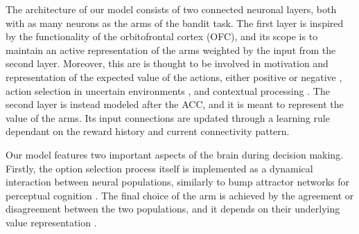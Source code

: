 The architecture of our model consists of two connected neuronal layers, both with as many neurons as the arms of the bandit task.
The first layer is inspired by the functionality of the orbitofrontal cortex (OFC), and its scope is to maintain an active representation of the arms weighted by the input from the second layer. Moreover, this are is thought to be involved in motivation and representation of the expected value of the actions, either positive or negative \cite{odohertyAbstractRewardPunishment2001, ricebergRewardStabilityDetermines2012, tremblayRelativeRewardPreference1999}, action selection in uncertain environments \cite{elliottDissociableFunctionsMedial2000}, and contextual processing \cite{frankAnatomyDecisionStriatoorbitofrontal2006}.
The second layer is instead modeled after the ACC, and it is meant to represent the value of the arms. Its input connections are updated through a learning rule dependant on the reward history and current connectivity pattern.

Our model features two important aspects of the brain during decision making. Firstly, the option selection process itself is implemented as a dynamical interaction between neural populations, similarly to bump attractor networks for perceptual cognition \cite{carrollEncodingCertaintyBump2014, esnaola-acebesBumpAttractorDynamics2021}.
The final choice of the arm is achieved by the agreement or disagreement between the two populations, and it depends on their underlying value representation \cite{bariDynamicDecisionMaking2021, houstonMatchingBehavioursRewards2021}.

